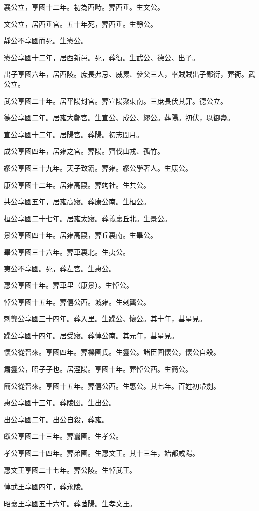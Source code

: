 \begin{pinyinscope}
襄公立，享國十二年。初為西畤。葬西垂。生文公。

文公立，居西垂宮。五十年死，葬西垂。生靜公。

靜公不享國而死。生憲公。

憲公享國十二年，居西新邑。死，葬衙。生武公、德公、出子。

出子享國六年，居西陵。庶長弗忌、威累、參父三人，率賊賊出子鄙衍，葬衙。武公立。

武公享國二十年。居平陽封宮。葬宣陽聚東南。三庶長伏其罪。德公立。

德公享國二年。居雍大鄭宮。生宣公、成公、繆公。葬陽。初伏，以御蠱。

宣公享國十二年。居陽宮。葬陽。初志閏月。

成公享國四年，居雍之宮。葬陽。齊伐山戎、孤竹。

繆公享國三十九年。天子致霸。葬雍。繆公學著人。生康公。

康公享國十二年。居雍高寢。葬竘社。生共公。

共公享國五年，居雍高寢。葬康公南。生桓公。

桓公享國二十七年。居雍太寢。葬義裏丘北。生景公。

景公享國四十年。居雍高寢，葬丘裏南。生畢公。

畢公享國三十六年。葬車裏北。生夷公。

夷公不享國。死，葬左宮。生惠公。

惠公享國十年。葬車里（康景）。生悼公。

悼公享國十五年。葬僖公西。城雍。生剌龔公。

剌龔公享國三十四年。葬入里。生躁公、懷公。其十年，彗星見。

躁公享國十四年。居受寢。葬悼公南。其元年，彗星見。

懷公從晉來。享國四年。葬櫟圉氏。生靈公。諸臣圍懷公，懷公自殺。

肅靈公，昭子子也。居涇陽。享國十年。葬悼公西。生簡公。

簡公從晉來。享國十五年。葬僖公西。生惠公。其七年。百姓初帶劍。

惠公享國十三年。葬陵圉。生出公。

出公享國二年。出公自殺，葬雍。

獻公享國二十三年。葬囂圉。生孝公。

孝公享國二十四年。葬弟圉。生惠文王。其十三年，始都咸陽。

惠文王享國二十七年。葬公陵。生悼武王。

悼武王享國四年，葬永陵。

昭襄王享國五十六年。葬茝陽。生孝文王。


\end{pinyinscope}
